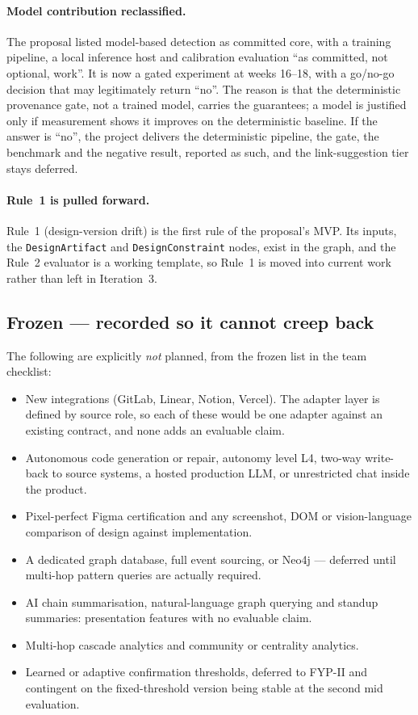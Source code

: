 \paragraph{Model contribution reclassified.} The proposal listed model-based
detection as committed core, with a training pipeline, a local inference host
and calibration evaluation ``as committed, not optional, work''. It is now a
gated experiment at weeks 16--18, with a go/no-go decision that may legitimately
return ``no''. The reason is that the deterministic provenance gate, not a
trained model, carries the guarantees; a model is justified only if measurement
shows it improves on the deterministic baseline. If the answer is ``no'', the
project delivers the deterministic pipeline, the gate, the benchmark and the
negative result, reported as such, and the link-suggestion tier stays deferred.

\paragraph{Rule~1 is pulled forward.} Rule~1 (design-version drift) is the first
rule of the proposal's MVP. Its inputs, the \texttt{DesignArtifact} and
\texttt{DesignConstraint} nodes, exist in the graph, and the Rule~2 evaluator is
a working template, so Rule~1 is moved into current work rather than left in
Iteration~3.

\subsection*{Frozen --- recorded so it cannot creep back}

The following are explicitly \emph{not} planned, from the frozen list in the
team checklist:

\begin{itemize}
  \item New integrations (GitLab, Linear, Notion, Vercel). The adapter layer is
        defined by source role, so each of these would be one adapter against an
        existing contract, and none adds an evaluable claim.
  \item Autonomous code generation or repair, autonomy level L4, two-way
        write-back to source systems, a hosted production LLM, or unrestricted
        chat inside the product.
  \item Pixel-perfect Figma certification and any screenshot, DOM or
        vision-language comparison of design against implementation.
  \item A dedicated graph database, full event sourcing, or Neo4j --- deferred
        until multi-hop pattern queries are actually required.
  \item AI chain summarisation, natural-language graph querying and standup
        summaries: presentation features with no evaluable claim.
  \item Multi-hop cascade analytics and community or centrality analytics.
  \item Learned or adaptive confirmation thresholds, deferred to FYP-II and
        contingent on the fixed-threshold version being stable at the second
        mid evaluation.
\end{itemize}

